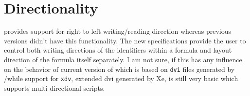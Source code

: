 \documentclass[a4paper]{article}
\begin{document}
\section{Directionality}

\ifvmode\leavevmode\fi
{} provides support for right to left writing/reading direction whereas previous versions didn't have this functionality. The new specifications provide the user to control both writing directions of the identifiers within a formula and layout direction of the formula itself separately. I am not sure, if this has any influence on the behavior of current version of \texht which is based on \verb+dvi+ files generated by \tex/\latex while support for \verb+xdv+, extended dvi generated by Xe\tex, is still very basic which supports multi-directional scripts.
\end{document}

